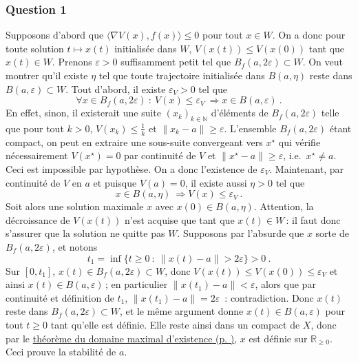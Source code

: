 \hypertarget{answer-lyap-1}{%
\subsubsection*{Question 1}\label{answer-lyap-1}}


Supposons d'abord que \(\langle\nabla V (x), f(x)\rangle \leq 0\) pour
tout \(x\in W\). On a donc pour toute solution \(t\mapsto x(t)\)
initialisée dans \(W\), \(V(x(t))\leq V(x(0))\) tant que \(x(t)\in W\).
Prenons \(\varepsilon>0\) suffisamment petit tel que
\(B_f(a,2\varepsilon)\subset W\). On veut montrer qu'il existe \(\eta\)
tel que toute trajectoire initialisée dans \(B(a,\eta)\) reste dans
\(B(a,\varepsilon)\subset W\). Tout d'abord, il existe
\(\varepsilon_V>0\) tel que \[
\forall x\in B_f(a,2\varepsilon) \ : \ V(x)\leq \varepsilon_V \ \Longrightarrow x\in B(a,\varepsilon) \ .
\] En effet, sinon, il existerait une suite \((x_k)_{k\in \mathbb{N}}\)
d'éléments de \(B_f(a,2\varepsilon)\) telle que pour tout \(k>0\),
\(V(x_k)\leq \frac{1}{k}\) et \(\|x_k-a\|\geq \varepsilon\). L'ensemble
\(B_f(a,2\varepsilon)\) étant compact, on peut en extraire une
sous-suite convergeant vers \(x^\star\) qui vérifie nécessairement
\(V(x^\star)=0\) par continuité de \(V\) et
\(\|x^\star-a\|\geq \varepsilon\), i.e.~\(x^\star \neq a\). Ceci est
impossible par hypothèse. On a donc l'existence de \(\varepsilon_V\).
Maintenant, par continuité de \(V\) en \(a\) et puisque \(V(a)=0\), il
existe aussi \(\eta>0\) tel que \[
x\in B(a,\eta)  \ \Longrightarrow V(x)\leq \varepsilon_V \ .
\] Soit alors une solution maximale \(x\) avec \(x(0)\in B(a,\eta)\).
Attention, la décroissance de \(V(x(t))\) n'est acquise que tant que
\(x(t)\in W\)\,: il faut donc s'assurer que la solution ne quitte pas
\(W\). Supposons par l'absurde que \(x\) sorte de
\(B_f(a,2\varepsilon)\), et notons \[
t_1=\inf\{t\geq 0 \ : \ \|x(t)-a\|> 2\varepsilon\} >0 \ .
\] Sur \([0,t_1]\), \(x(t)\in B_f(a,2\varepsilon)\subset W\), donc
\(V(x(t))\leq V(x(0))\leq \varepsilon_V\) et ainsi
\(x(t)\in B(a,\varepsilon)\)\,; en particulier \(\|x(t_1)-a\|<\varepsilon\),
alors que par continuité et définition de \(t_1\),
\(\|x(t_1)-a\|=2\varepsilon\)~: contradiction. Donc \(x(t)\) reste dans
\(B_f(a,2\varepsilon)\subset W\), et le même argument donne
\(x(t)\in B(a,\varepsilon)\) pour tout \(t\geq 0\) tant qu'elle est
définie. Elle reste ainsi dans un compact de \(X\), donc par le
\protect\hyperlink{theo_bouts}{théorème du domaine maximal d'existence
(p. \pageref*{theo_bouts})}, \(x\) est définie sur
\(\mathbb{R}_{\geq 0}\). Ceci prouve la stabilité de \(a\).

